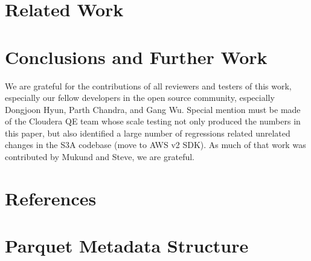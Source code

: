 \documentclass[manuscript]{acmart}
\begin{document}
\section{Related Work}\label{sec:related-work}

\section{Conclusions and Further Work}
\label{sec:conclusions}




\begin{acks}
We are grateful for the contributions of all reviewers and testers of this work,
especially our fellow developers in the open source community,
especially Dongjoon Hyun, Parth Chandra, and Gang Wu.
Special mention must be made of the Cloudera QE team whose scale testing
not only produced the numbers in this paper, but also identified a large number
of regressions related unrelated changes in the S3A codebase (move to AWS v2 SDK).
As much of that work was contributed by Mukund and Steve, we are grateful.
\end{acks}



\section{References}
\label{sec:references}










\appendix{}

\section{Parquet Metadata Structure}
\label{sec:parquet-metadata}
\end{document}
